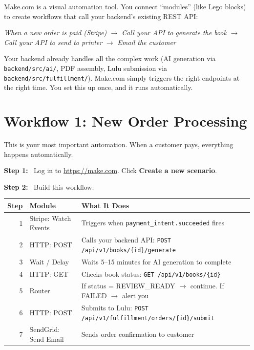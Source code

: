 \documentclass[12pt, letterpaper, oneside]{book}
\newcommand{\step}[1]{\noindent\textbf{\textcolor{primary}{Step #1:}}~}
\begin{document}
Make.com is a visual automation tool. You connect ``modules'' (like Lego blocks) to create workflows that call your backend's existing REST API:

\begin{center}
\textit{When a new order is paid (Stripe)} $\rightarrow$ \textit{Call your API to generate the book} $\rightarrow$ \textit{Call your API to send to printer} $\rightarrow$ \textit{Email the customer}
\end{center}

Your backend already handles all the complex work (AI generation via \texttt{backend/src/ai/}, PDF assembly, Lulu submission via \texttt{backend/src/fulfillment/}). Make.com simply triggers the right endpoints at the right time. You set this up once, and it runs automatically.

\section{Workflow 1: New Order Processing}

This is your most important automation. When a customer pays, everything happens automatically.

\step{1} Log in to \url{https://make.com}. Click \textbf{Create a new scenario}.

\step{2} Build this workflow:

\begin{table}[H]
\centering
\small
\begin{tabularx}{\textwidth}{rlX}
\toprule
\textbf{Step} & \textbf{Module} & \textbf{What It Does} \\
\midrule
1 & Stripe: Watch Events & Triggers when \texttt{payment\_intent.succeeded} fires \\
2 & HTTP: POST & Calls your backend API: \texttt{POST /api/v1/books/\{id\}/generate} \\
3 & Wait / Delay & Waits 5--15 minutes for AI generation to complete \\
4 & HTTP: GET & Checks book status: \texttt{GET /api/v1/books/\{id\}} \\
5 & Router & If status = REVIEW\_READY $\rightarrow$ continue. If FAILED $\rightarrow$ alert you \\
6 & HTTP: POST & Submits to Lulu: \texttt{POST /api/v1/fulfillment/orders/\{id\}/submit} \\
7 & SendGrid: Send Email & Sends order confirmation to customer \\
\bottomrule
\end{tabularx}
\end{table}
\end{document}

